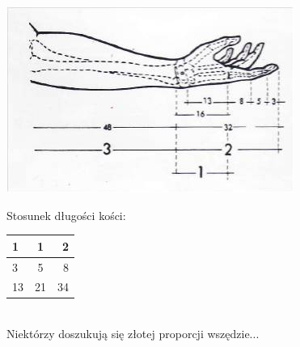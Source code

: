 \documentclass[a4paper,10pt,notitlepage]{report}
\begin{document}
\begin{flushleft}
\includegraphics[scale=1]{figure}\
\end{flushleft}
Stosunek długości kości:
\begin{tabular}[H]{|| l || c || r ||}
			\hline
			\hline
			1 & 1 & 2 \\ \hline
			3 & 5 & 8 \\ \hline
			13 & 21 & 34 \\
			\hline
			\hline
  \end{tabular}
\\
Niektórzy doszukują się złotej proporcji wszędzie...\\
\end{document}

